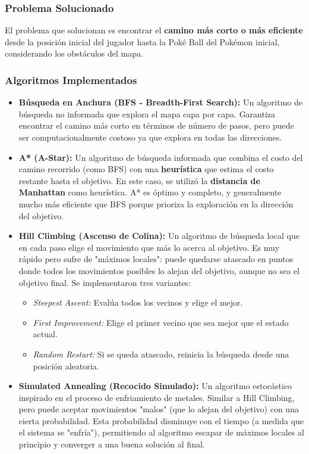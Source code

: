 \documentclass[12pt, oneside, openany]{book}
\begin{document}
\subsubsection{Problema Solucionado}
El problema que solucionan es encontrar el \textbf{camino más corto o más eficiente} desde la posición inicial del jugador hasta la Poké Ball del Pokémon inicial, considerando los obstáculos del mapa.

\subsubsection{Algoritmos Implementados}
\begin{itemize}
    \item \textbf{Búsqueda en Anchura (BFS - Breadth-First Search):} Un algoritmo de búsqueda no informada que explora el mapa capa por capa. Garantiza encontrar el camino más corto en términos de número de pasos, pero puede ser computacionalmente costoso ya que explora en todas las direcciones.
    \item \textbf{A* (A-Star):} Un algoritmo de búsqueda informada que combina el costo del camino recorrido (como BFS) con una \textbf{heurística} que estima el costo restante hasta el objetivo. En este caso, se utilizó la \textbf{distancia de Manhattan} como heurística. A* es óptimo y completo, y generalmente mucho más eficiente que BFS porque prioriza la exploración en la dirección del objetivo.
    \item \textbf{Hill Climbing (Ascenso de Colina):} Un algoritmo de búsqueda local que en cada paso elige el movimiento que más lo acerca al objetivo. Es muy rápido pero sufre de "máximos locales": puede quedarse atascado en puntos donde todos los movimientos posibles lo alejan del objetivo, aunque no sea el objetivo final. Se implementaron tres variantes:
    \begin{itemize}
        \item \textit{Steepest Ascent:} Evalúa todos los vecinos y elige el mejor.
        \item \textit{First Improvement:} Elige el primer vecino que sea mejor que el estado actual.
        \item \textit{Random Restart:} Si se queda atascado, reinicia la búsqueda desde una posición aleatoria.
    \end{itemize}
    \item \textbf{Simulated Annealing (Recocido Simulado):} Un algoritmo estocástico inspirado en el proceso de enfriamiento de metales. Similar a Hill Climbing, pero puede aceptar movimientos "malos" (que lo alejan del objetivo) con una cierta probabilidad. Esta probabilidad disminuye con el tiempo (a medida que el sistema se "enfría"), permitiendo al algoritmo escapar de máximos locales al principio y converger a una buena solución al final.
\end{itemize}
\end{document}

